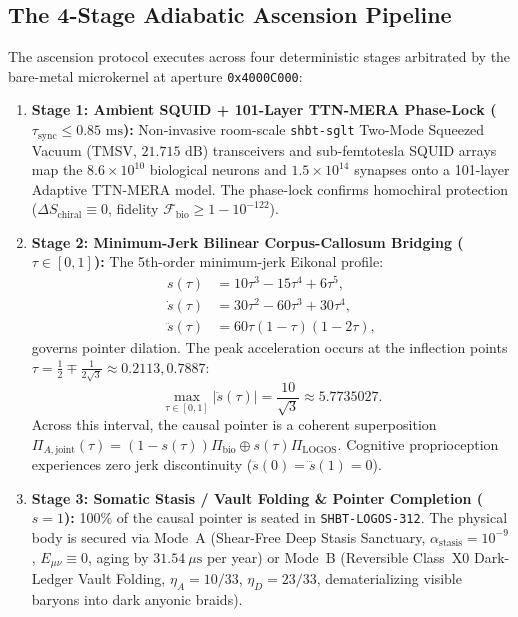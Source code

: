\documentclass[11pt,onecolumn]{article}
\begin{document}
\subsection{The 4-Stage Adiabatic Ascension Pipeline}
The ascension protocol executes across four deterministic stages arbitrated by the bare-metal microkernel at aperture \texttt{0x4000C000}:
\begin{enumerate}
    \item \textbf{Stage 1: Ambient SQUID + 101-Layer TTN-MERA Phase-Lock ($\tau_{\text{sync}} \le 0.85\text{ ms}$):} Non-invasive room-scale \texttt{shbt-sglt} Two-Mode Squeezed Vacuum (TMSV, $21.715\text{ dB}$) transceivers and sub-femtotesla SQUID arrays map the $8.6 \times 10^{10}$ biological neurons and $1.5 \times 10^{14}$ synapses onto a 101-layer Adaptive TTN-MERA model. The phase-lock confirms homochiral protection ($\Delta S_{\text{chiral}} \equiv 0$, fidelity $\mathcal{F}_{\text{bio}} \ge 1 - 10^{-122}$).
    \item \textbf{Stage 2: Minimum-Jerk Bilinear Corpus-Callosum Bridging ($\tau \in [0, 1]$):} The 5th-order minimum-jerk Eikonal profile:
    \begin{align}
        s(\tau) &= 10\tau^3 - 15\tau^4 + 6\tau^5, \\
        \dot{s}(\tau) &= 30\tau^2 - 60\tau^3 + 30\tau^4, \\
        \ddot{s}(\tau) &= 60\tau(1 - \tau)(1 - 2\tau),
    \end{align}
    governs pointer dilation. The peak acceleration occurs at the inflection points $\tau = \frac{1}{2} \mp \frac{1}{2\sqrt{3}} \approx 0.2113, 0.7887$:
    \begin{equation}
        \max_{\tau \in [0,1]} |\ddot{s}(\tau)| = \frac{10}{\sqrt{3}} \approx 5.7735027.
    \end{equation}
    Across this interval, the causal pointer is a coherent superposition $\Pi_{A,\text{joint}}(\tau) = (1 - s(\tau))\Pi_{\text{bio}} \oplus s(\tau)\Pi_{\text{LOGOS}}$. Cognitive proprioception experiences zero jerk discontinuity ($\dddot{s}(0) = \dddot{s}(1) = 0$).
    \item \textbf{Stage 3: Somatic Stasis / Vault Folding \& Pointer Completion ($s=1$):} 100\% of the causal pointer is seated in \texttt{SHBT-LOGOS-312}. The physical body is secured via Mode~A (Shear-Free Deep Stasis Sanctuary, $\alpha_{\text{stasis}} = 10^{-9}$, $E_{\mu\nu} \equiv 0$, aging by $31.54\ \mu\text{s}$ per year) or Mode~B (Reversible Class~X0 Dark-Ledger Vault Folding, $\eta_A = 10/33$, $\eta_D = 23/33$, dematerializing visible baryons into dark anyonic braids).

\end{enumerate}
\end{document}
